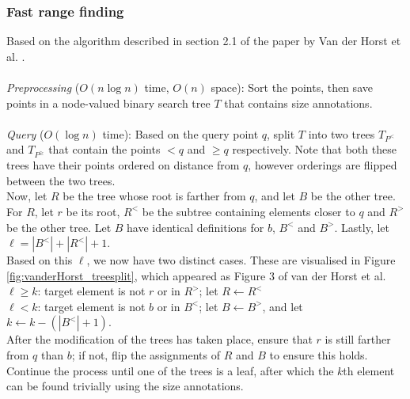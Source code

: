 \documentclass{article}
\newcommand{\fb}[1]{{\color{blue}#1}}
\begin{document}
\subsubsection{Fast range finding}
Based on the algorithm described in section 2.1 of the paper by Van der Horst
et al. \cite{vanderhorst_et_al:LIPIcs.ESA.2022.67}. \\\\ 
\textit{Preprocessing} ($O(n \log n)$ time, $O(n)$ space): Sort the points, then save
points in a node-valued binary search tree $T$ that contains size annotations.
\\\\ \textit{Query} ($O(\log n)$ time): Based on the query point $q$, split $T$ into two trees
$T_{P^<}$ and $T_{P^{\geq}}$ that contain the points $< q$ and $\geq q$
respectively. Note that both these trees have their points ordered on distance
from $q$, however orderings are flipped between the two trees. \\ Now, let $R$
be the tree whose root is farther from $q$, and let $B$ be the other tree. For
$R$, let $r$ be its root, $R^<$ be the subtree containing elements closer to
$q$ and $R^>$ be the other tree. Let $B$ have identical definitions for $b$,
$B^<$ and $B^>$. Lastly, let $\ell = |B^<| + |R^<| + 1$. \\ Based on this
$\ell$, we now have two distinct cases. \fb{These are visualised in Figure \ref{fig:vanderHorst_treesplit}, which appeared as Figure 3 of van der Horst et al.} \\ 
$\ell \geq k$: target element is
not $r$ or in $R^>$; let $R \leftarrow R^<$\\ $\ell < k$: target element is not
$b$ or in $B^<$; let $B \leftarrow B^>$, and let $k \leftarrow k - (|B^<| +
    1)$. \\ After the modification of the trees has taken place, ensure that $r$ is
still farther from $q$ than $b$; if not, flip the assignments of $R$ and $B$ to
ensure this holds. Continue the process until one of the trees is a leaf, after
which the $k$th element can be found trivially using the size annotations.
\end{document}
